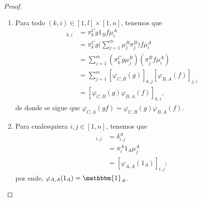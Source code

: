 \documentclass[tesis]{subfiles}
\begin{document}
\begin{proof}\leavevmode

    \begin{enumerate}[label=(\alph*)]
    
        \item Para todo $(k,i)\in[1,l]\times[1,n]$, tenemos que
            \begin{align*}
                [\varphi_{C,A}(gf)]_{k,i} &= \pi_k^Cg1_B f\mu_i^A \\
                                          &= \pi_k^Cg\bigg(\sum_{j=1}^m \mu_j^B\pi_j^B \bigg)f\mu_i^A \\
                                          &= \sum_{j=1}^m (\pi_k^Cg\mu_j^B)(\pi_j^Bf\mu_i^A) \\
                                          &= \sum_{j=1}^m [\varphi_{C,B}(g)]_{k,j} [\varphi_{B,A}(f)]_{j,i} \\
                                          &= [\varphi_{C,B}(g)\varphi_{B,A}(f)]_{k,i},
            \end{align*}
            de donde se sigue que $\varphi_{C,A}(gf) = \varphi_{C,B}(g)\varphi_{B,A}(f)$.

        \item Para cualesquiera $i,j\in[1,n]$, tenemos que
            \begin{align*}
                [\mathbbm{1}_A]_{i,j} &= \delta_{i,j}^A \\
                                      &= \pi_i^A1_A\mu_j^A \\
                                      &= [\varphi_{A,A}(1_A)]_{i,j};
            \end{align*}
            por ende, $\varphi_{A,A}(1_A) = \mathbbm{1}_A$.
    \end{enumerate}
\end{proof}
\end{document}
